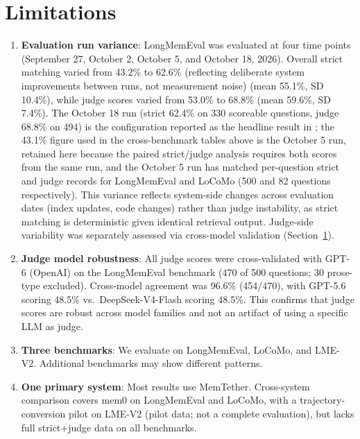 \documentclass[10pt]{article}
\begin{document}
\section{Limitations}
\label{sec:limitations}
\begin{enumerate}
\item \textbf{Evaluation run variance}: LongMemEval was evaluated at four time points (September 27, October 2, October 5, and October 18, 2026). Overall strict matching varied from 43.2\% to 62.6\% (reflecting deliberate system improvements between runs, not measurement noise) (mean 55.1\%, SD 10.4\%), while judge scores varied from 53.0\% to 68.8\% (mean 59.6\%, SD 7.4\%). The October 18 run (strict 62.4\% on 330 scoreable questions, judge 68.8\% on 494) is the configuration reported as the headline result in \cite{companionjss}; the 43.1\% figure used in the cross-benchmark tables above is the October 5 run, retained here because the paired strict/judge analysis requires both scores from the same run, and the October 5 run has matched per-question strict and judge records for LongMemEval and LoCoMo (500 and 82 questions respectively). This variance reflects system-side changes across evaluation dates (index updates, code changes) rather than judge instability, as strict matching is deterministic given identical retrieval output. Judge-side variability was separately assessed via cross-model validation (Section~\ref{sec:limitations}).
\item \textbf{Judge model robustness}: All judge scores were cross-validated with GPT-6 (OpenAI) on the LongMemEval benchmark (470 of 500 questions; 30 prose-type excluded). Cross-model agreement was 96.6\% (454/470), with GPT-5.6 scoring 48.5\% vs.\ DeepSeek-V4-Flash scoring 48.5\%. This confirms that judge scores are robust across model families and not an artifact of using a specific LLM as judge.
\item \textbf{Three benchmarks}: We evaluate on LongMemEval, LoCoMo, and LME-V2. Additional benchmarks may show different patterns.
\item \textbf{One primary system}: Most results use MemTether. Cross-system comparison covers mem0 on LongMemEval and LoCoMo, with a trajectory-conversion pilot on LME-V2 (pilot data; not a complete evaluation), but lacks full strict+judge data on all benchmarks.

\end{enumerate}
\end{document}
